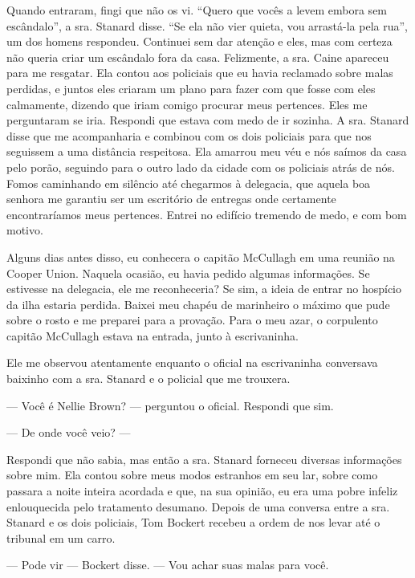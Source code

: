 
Quando entraram, fingi que não os vi. ``Quero que vocês a levem embora sem
escândalo'', a sra. Stanard disse. ``Se ela não vier quieta, vou
arrastá-la pela rua'', um dos homens respondeu. Continuei sem dar
atenção e eles, mas com certeza não queria criar um escândalo fora da
casa. Felizmente, a sra. Caine apareceu para me resgatar. Ela contou aos
policiais que eu havia reclamado sobre malas perdidas, e juntos eles
criaram um plano para fazer com que fosse com eles calmamente, dizendo
que iriam comigo procurar meus pertences. Eles me perguntaram se iria.
Respondi que estava com medo de ir sozinha. A sra. Stanard disse que me
acompanharia e combinou com os dois policiais para que nos seguissem a
uma distância respeitosa. Ela amarrou meu véu e nós saímos da casa pelo
porão, seguindo para o outro lado da cidade com os policiais atrás de
nós. Fomos caminhando em silêncio até chegarmos à delegacia, que aquela
boa senhora me garantiu ser um escritório de entregas onde certamente
encontraríamos meus pertences. Entrei no edifício tremendo de medo, e
com bom motivo.

Alguns dias antes disso, eu conhecera o capitão McCullagh em uma reunião
na Cooper Union. Naquela ocasião, eu havia pedido algumas informações.
Se estivesse na delegacia, ele me reconheceria? Se sim, a ideia de
entrar no hospício da ilha estaria perdida. Baixei meu chapéu de
marinheiro o máximo que pude sobre o rosto e me preparei para a provação.
Para o meu azar, o corpulento capitão McCullagh estava na entrada, junto
à escrivaninha.

Ele me observou atentamente enquanto o oficial na escrivaninha
conversava baixinho com a sra. Stanard e o policial que me trouxera.

--- Você é Nellie Brown? --- perguntou o oficial. Respondi que sim.

--- De onde você veio? --- 

Respondi que não sabia, mas então a sra.
Stanard forneceu diversas informações sobre mim. Ela contou sobre meus
modos estranhos em seu lar, sobre como passara a noite inteira acordada
e que, na sua opinião, eu era uma pobre infeliz enlouquecida pelo
tratamento desumano. Depois de uma conversa entre a sra. Stanard e os
dois policiais, Tom Bockert recebeu a ordem de nos levar até o tribunal
em um carro.

--- Pode vir --- Bockert disse. --- Vou achar suas malas para você. 

